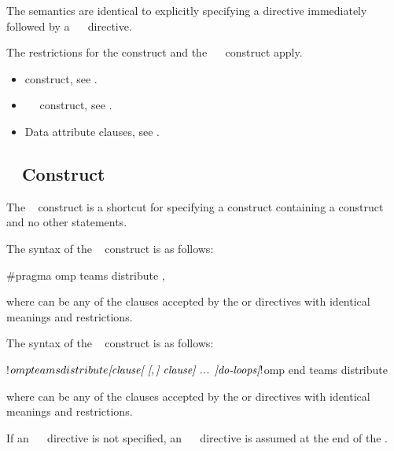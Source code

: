 \descr
The semantics are identical to explicitly specifying a  directive
immediately followed by a ~~ directive.

\restrictions
The restrictions for the  construct and the
~~ construct apply.

\crossreferences
\begin{itemize}
\item {} construct, see
.

\item {}~~ construct, see
.

\item Data attribute clauses, see
.
\end{itemize}



\subsection{~ Construct}
\label{subsec:teams distribute Construct}

\summary
The ~ construct is a shortcut for specifying 
a  construct containing a  construct and no 
other statements.

\syntax
\begin{ccppspecific}
The syntax of the ~ construct is as follows:

\begin{ompcPragma}
#pragma omp teams distribute \plc{[clause[ [},\plc{] clause] ... ] new-line}
\end{ompcPragma}

where  can be any of the clauses accepted by the  
or  directives with identical meanings and restrictions.
\end{ccppspecific}

\begin{fortranspecific}
The syntax of the ~ construct is as follows:

\begin{ompfPragma}
!$omp teams distribute \plc{[clause[ [},\plc{] clause] ... ]}
    \plc{do-loops}
\plc{[}!$omp end teams distribute\plc{]}
\end{ompfPragma}

where  can be any of the clauses accepted by the  
or  directives with identical meanings and restrictions.

If an ~~ directive is not specified, an
~~ directive is assumed at the end of 
the .
\end{fortranspecific}

